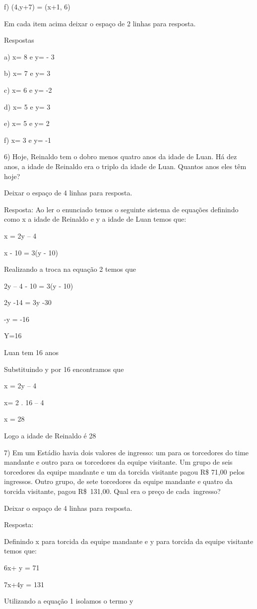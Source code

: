 {f) (4,y+7) = (x+1, 6)

Em cada item acima deixar o espaço de 2 linhas para resposta.

Respostas

a) x= 8 e y= - 3

b) x= 7 e y= 3

c) x= 6 e y= -2

d) x= 5 e y= 3

e) x= 5 e y= 2

f) x= 3 e y= -1

6) Hoje, Reinaldo tem o dobro menos quatro anos da idade de Luan. Há dez
anos, a idade de Reinaldo era o triplo da idade de Luan. Quantos anos
eles têm hoje?

Deixar o espaço de 4 linhas para resposta.

Resposta: Ao ler o enunciado temos o seguinte sistema de equações
definindo como x a idade de Reinaldo e y a idade de Luan temos que:

x = 2y -- 4

x - 10 = 3(y - 10)

Realizando a troca na equação 2 temos que

2y -- 4 - 10 = 3(y - 10)

2y -14 = 3y -30

-y = -16

Y=16

Luan tem 16 anos

Substituindo y por 16 encontramos que

x = 2y -- 4

x= 2 . 16 -- 4

x = 28

Logo a idade de Reinaldo é 28

7) Em um Estádio havia dois valores de ingresso: um para os torcedores
do time mandante e outro para os torcedores da equipe visitante. Um
grupo de seis torcedores da equipe mandante e um da torcida visitante
pagou R\$ 71,00 pelos ingressos. Outro grupo, de sete torcedores da
equipe mandante e quatro da torcida visitante, pagou R\$~131,00. Qual
era o preço de cada~ingresso?

Deixar o espaço de 4 linhas para resposta.

Resposta:

Definindo x para torcida da equipe mandante e y para torcida da equipe
visitante temos que:

6x+ y = 71

7x+4y = 131

Utilizando a equação 1 isolamos o termo y

}

